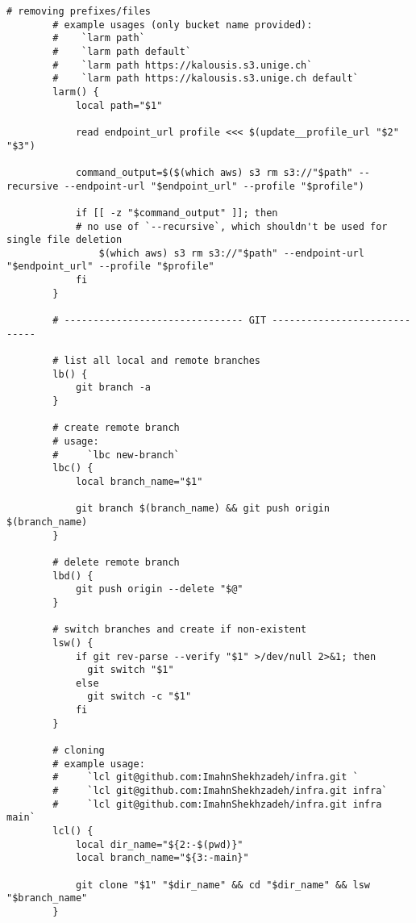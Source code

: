 \documentclass[12pt, a4paper]{article}
\numberwithin{equation}{section}
\theoremstyle{definition}
\theoremstyle{definition}
\begin{document}
\begin{lstlisting}[style=mystylebash, label=alg:bashrc_contents, xleftmargin=\parindent]
		# removing prefixes/files
		# example usages (only bucket name provided):
		#    `larm path`
		#    `larm path default`
		#    `larm path https://kalousis.s3.unige.ch`
		#    `larm path https://kalousis.s3.unige.ch default`
		larm() {
			local path="$1"
			
			read endpoint_url profile <<< $(update__profile_url "$2" "$3")
			
			command_output=$($(which aws) s3 rm s3://"$path" --recursive --endpoint-url "$endpoint_url" --profile "$profile")
			
			if [[ -z "$command_output" ]]; then
			# no use of `--recursive`, which shouldn't be used for single file deletion
				$(which aws) s3 rm s3://"$path" --endpoint-url "$endpoint_url" --profile "$profile"
			fi
		}
		
		# ------------------------------- GIT -----------------------------
		
		# list all local and remote branches
		lb() {
			git branch -a
		}
		
		# create remote branch
		# usage:
		#     `lbc new-branch`
		lbc() {
			local branch_name="$1"

			git branch $(branch_name) && git push origin $(branch_name)
		}
		
		# delete remote branch
		lbd() {
			git push origin --delete "$@"
		}

		# switch branches and create if non-existent
		lsw() {                                                                                                           
			if git rev-parse --verify "$1" >/dev/null 2>&1; then                                                            
			  git switch "$1"                                                                                               
			else                                                                                                            
			  git switch -c "$1"                                                                                            
			fi                                                                                                              
		}
	
		# cloning
		# example usage:
		#     `lcl git@github.com:ImahnShekhzadeh/infra.git `
		#     `lcl git@github.com:ImahnShekhzadeh/infra.git infra`
		#     `lcl git@github.com:ImahnShekhzadeh/infra.git infra main`
		lcl() {
			local dir_name="${2:-$(pwd)}"
			local branch_name="${3:-main}"
			
			git clone "$1" "$dir_name" && cd "$dir_name" && lsw "$branch_name"
		}


\end{lstlisting}
\end{document}
